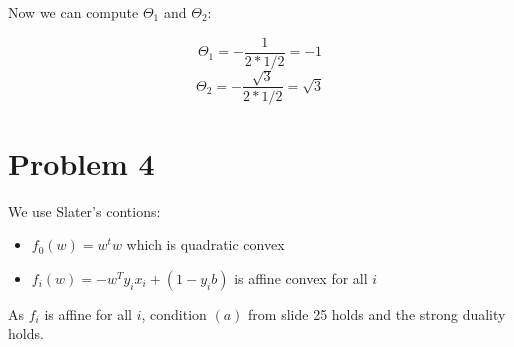 \documentclass[12pt,letterpaper]{article}
\begin{document}
Now we can compute $\Theta_1$ and $\Theta_2$:

$$\Theta_1 = -\frac{1}{2*1/2} = -1$$
$$\Theta_2 = -\frac{\sqrt{3}}{2*1/2} = \sqrt{3}$$
 
\section*{Problem 4}

We use Slater's contions:

\begin{itemize}
\item $f_0(w) = w^tw$ which is quadratic convex 
\item $f_i(w) = -w^Ty_ix_i + (1-y_ib)$ is affine convex for all $i$
\end{itemize}

As $f_i$ is affine for all $i$, condition $(a)$ from slide 25 holds and the strong duality holds.
\end{document}
